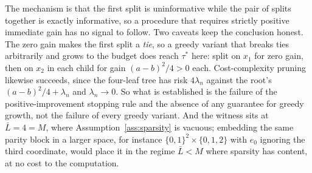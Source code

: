 \documentclass[11pt]{article}
\theoremstyle{plain}
\theoremstyle{definition}
\theoremstyle{remark}
\newcommand{\ez}{e_0}
\begin{document}
\noindent The mechanism is that the first split is uninformative while the pair of
splits together is exactly informative, so a procedure that requires strictly
positive immediate gain has no signal to follow. Two caveats keep the conclusion
honest. The zero gain makes the first split a \emph{tie}, so a greedy variant that
breaks ties arbitrarily and grows to the budget does reach $\tau^*$ here: split on
$x_1$ for zero gain, then on $x_2$ in each child for gain $(a-b)^2/4>0$ each.
Cost-complexity pruning likewise succeeds, since the four-leaf tree has risk
$4\lambda_n$ against the root's $(a-b)^2/4+\lambda_n$ and $\lambda_n\to0$. So what
is established is the failure of the positive-improvement stopping rule and the
absence of any guarantee for greedy growth, not the failure of every greedy
variant. And the witness sits at $\bar L=4=M$, where
Assumption~\ref{ass:sparsity} is vacuous; embedding the same parity block in a
larger space, for instance $\{0,1\}^2\times\{0,1,2\}$ with $\ez$ ignoring the
third coordinate, would place it in the regime $\bar L<M$ where sparsity has
content, at no cost to the computation.
\end{document}
